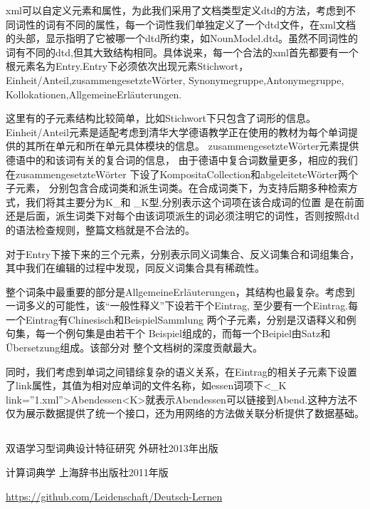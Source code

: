 \documentclass[12pt,twocolumn]{article}
\begin{document}
	xml可以自定义元素和属性，为此我们采用了文档类型定义dtd的方法，考虑到不同词性的词有不同的属性，每一个词性我们单独定义了一个dtd文件，在xml文档的头部，显示指明了它被哪一个dtd所约束，如NounModel.dtd。虽然不同词性的词有不同的dtd,但其大致结构相同。具体说来，每一个合法的xml首先都要有一个根元素名为Entry.Entry下必须依次出现元素Stichwort，Einheit/Anteil,zusammengesetzteWörter,
Synonymegruppe,Antonymegruppe,
Kollokationen,AllgemeineErläuterungen.

这里有的子元素结构比较简单，比如Stichwort下只包含了词形的信息。
Einheit/Anteil元素是适配考虑到清华大学德语教学正在使用的教材为每个单词提供的其所在单元和所在单元具体模块的信息。
zusammengesetzteWörter元素提供德语中的和该词有关的复合词的信息，
由于德语中复合词数量更多，相应的我们在zusammengesetzteWörter
下设了KompositaCollection和abgeleiteteWörter两个子元素，
分别包含合成词类和派生词类。在合成词类下，为支持后期多种检索方式，我们将其主要分为K\_和 \_K型,分别表示这个词项在该合成词的位置
是在前面还是后面，派生词类下对每个由该词项派生的词必须注明它的词性，否则按照dtd的语法检查规则，整篇文档就是不合法的。

对于Entry下接下来的三个元素，分别表示同义词集合、反义词集合和词组集合，其中我们在编辑的过程中发现，同反义词集合具有稀疏性。

整个词条中最重要的部分是AllgemeineErläuterungen，其结构也最复杂。考虑到一词多义的可能性，该“一般性释义”下设若干个Eintrag,
至少要有一个Eintrag.每一个Eintrag有Chinesisch和BeispielSammlung
两个子元素，分别是汉语释义和例句集，每一个例句集是由若干个
Beispiel组成的，而每一个Beipiel由Satz和Übersetzung组成。该部分对
整个文档树的深度贡献最大。

同时，我们考虑到单词之间错综复杂的语义关系，在Eintrag的相关子元素下设置了link属性，其值为相对应单词的文件名称，如essen词项下<\_K link=''1.xml''>Abendessen<\/K>就表示Abendessen可以链接到Abend.这种方法不仅为展示数据提供了统一个接口，还为用网络的方法做关联分析提供了数据基础。
\subsection{\textbf{}}

\begin{thebibliography}{}
双语学习型词典设计特征研究 外研社2013年出版

 计算词典学 上海辞书出版社2011年版

 \url{https://github.com/Leidenschaft/Deutsch-Lernen}
\end{thebibliography}
\end{document}
